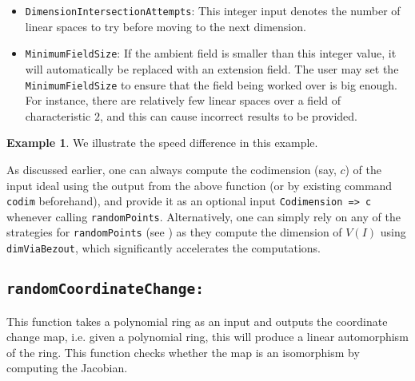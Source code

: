 \documentclass[11pt]{amsart}
\theoremstyle{definition}
\newtheorem{example}{Example}[section]
\begin{document}
\begin{itemize}
	\item {\tt DimensionIntersectionAttempts}: 
	This integer input denotes the number of linear spaces to try before moving to the next dimension.
	\item {\tt MinimumFieldSize}:
	If the ambient field is smaller than this integer value, it will automatically be replaced with an extension field. The user may set the {\tt MinimumFieldSize} to ensure that the field being worked over is big enough.  For instance, there are relatively few linear spaces over a field of characteristic $2$, and this can cause incorrect results to be provided. 
\end{itemize}

\begin{example} We illustrate the speed difference in this example.
	{}
\end{example}

As discussed earlier, one can always compute the codimension (say, $c$) of the input ideal using the output from the above function (or by existing command {\tt codim} beforehand), and provide it as an optional input {\tt Codimension => c} whenever calling {\tt randomPoints}. Alternatively, one can simply rely on any of the strategies for {\tt randomPoints} (see ) as they compute the dimension of $V(I)$ using {\tt dimViaBezout}, which significantly accelerates the computations.

\subsection*{\tt randomCoordinateChange:} 

This function takes a polynomial ring as an input and outputs the coordinate change map,
i.e. given a polynomial ring, this will produce a linear automorphism of the ring.  This function checks whether the map is an isomorphism by computing the Jacobian.
\end{document}
